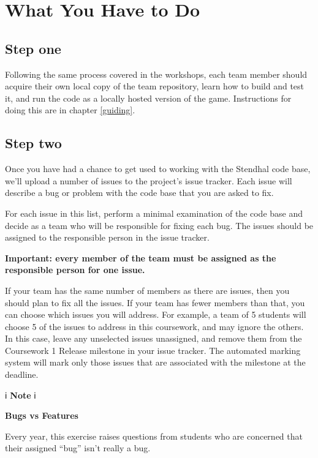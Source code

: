 \documentclass[
]{book}
\begin{document}
\hypertarget{what-you-have-to-do}{%
\section{What You Have to Do}\label{what-you-have-to-do}}

\hypertarget{stepone}{%
\subsection{Step one}\label{stepone}}

Following the same process covered in the workshops, each team member should acquire their own local copy of the team repository, learn how to build and test it, and run the code as a locally hosted version of the game. Instructions for doing this are in chapter \ref{guiding}.

\hypertarget{steptwo}{%
\subsection{Step two}\label{steptwo}}

Once you have had a chance to get used to working with the Stendhal code base, we'll upload a number of issues to the project's issue tracker. Each issue will describe a bug or problem with the code base that you are asked to fix.

For each issue in this list, perform a minimal examination of the code base and decide as a team who will be responsible for fixing each bug. The issues should be assigned to the responsible person in the issue tracker.

\textbf{Important: every member of the team must be assigned as the responsible person for one issue.}

If your team has the same number of members as there are issues, then you should plan to fix all the issues. If your team has fewer members than that, you can choose which issues you will address. For example, a team of 5 students will choose 5 of the issues to address in this coursework, and may ignore the others. In this case, leave any unselected issues unassigned, and remove them from the Coursework 1 Release milestone in your issue tracker. The automated marking system will mark only those issues that are associated with the milestone at the deadline.

ℹ️ \textbf{Note} ℹ️

\textbf{Bugs vs Features}

Every year, this exercise raises questions from students who are concerned that their assigned ``bug'' isn't really a bug.
\end{document}
